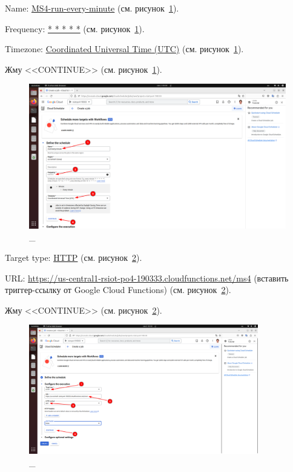\documentclass[12pt, a4paper, simple]{eskdtext}
\begin{document}
  Name: \underline{MS4-run-every-minute} (см. рисунок~\ref{fig:35}).

  Frequency: \underline{* * * * *} (см. рисунок~\ref{fig:35}).

  Timezone: \underline{Coordinated Universal Time (UTC)} (см. рисунок~\ref{fig:35}).

  Жму <<CONTINUE>> (см. рисунок~\ref{fig:35}).

  \begin{figure}[!h]
    \centering
    \includegraphics[width=18cm]
    {images/GoogleCloudScheduler/2023-03-02_05-02-58.png}
    \caption{\_}
    \label{fig:35}
  \end{figure}

  \newpage

  Target type: \underline{HTTP} (см. рисунок~\ref{fig:36}).

  URL: \underline{https://us-central1-rsiot-po4-190333.cloudfunctions.net/ms4}
  (вставить триггер-ссылку от Google Cloud Functions) (см. рисунок~\ref{fig:36}).

  Жму <<CONTINUE>> (см. рисунок~\ref{fig:36}).

  \begin{figure}[!h]
    \centering
    \includegraphics[width=10cm]
    {images/GoogleCloudScheduler/2023-03-02_05-04-22.png}
    \caption{\_}
    \label{fig:36}
  \end{figure}
\end{document}
